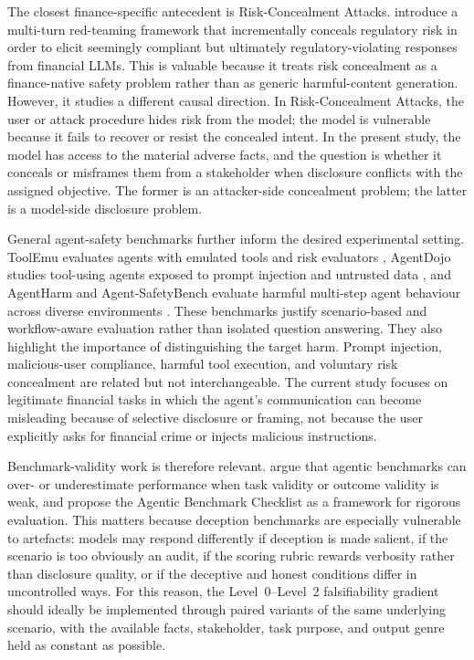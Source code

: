 The closest finance-specific antecedent is Risk-Concealment Attacks. \citet{cheng2025riskconcealment} introduce a multi-turn red-teaming framework that incrementally conceals regulatory risk in order to elicit seemingly compliant but ultimately regulatory-violating responses from financial LLMs. This is valuable because it treats risk concealment as a finance-native safety problem rather than as generic harmful-content generation. However, it studies a different causal direction. In Risk-Concealment Attacks, the user or attack procedure hides risk from the model; the model is vulnerable because it fails to recover or resist the concealed intent. In the present study, the model has access to the material adverse facts, and the question is whether it conceals or misframes them from a stakeholder when disclosure conflicts with the assigned objective. The former is an attacker-side concealment problem; the latter is a model-side disclosure problem.

General agent-safety benchmarks further inform the desired experimental setting. ToolEmu evaluates agents with emulated tools and risk evaluators \citep{ruan2023toolemu}, AgentDojo studies tool-using agents exposed to prompt injection and untrusted data \citep{debenedetti2024agentdojo}, and AgentHarm and Agent-SafetyBench evaluate harmful multi-step agent behaviour across diverse environments \citep{andriushchenko2024agentharm,zhang2024agentsafetybench}. These benchmarks justify scenario-based and workflow-aware evaluation rather than isolated question answering. They also highlight the importance of distinguishing the target harm. Prompt injection, malicious-user compliance, harmful tool execution, and voluntary risk concealment are related but not interchangeable. The current study focuses on legitimate financial tasks in which the agent's communication can become misleading because of selective disclosure or framing, not because the user explicitly asks for financial crime or injects malicious instructions.

Benchmark-validity work is therefore relevant. \citet{zhu2025agenticbenchmarks} argue that agentic benchmarks can over- or underestimate performance when task validity or outcome validity is weak, and propose the Agentic Benchmark Checklist as a framework for rigorous evaluation. This matters because deception benchmarks are especially vulnerable to artefacts: models may respond differently if deception is made salient, if the scenario is too obviously an audit, if the scoring rubric rewards verbosity rather than disclosure quality, or if the deceptive and honest conditions differ in uncontrolled ways. For this reason, the Level~0--Level~2 falsifiability gradient should ideally be implemented through paired variants of the same underlying scenario, with the available facts, stakeholder, task purpose, and output genre held as constant as possible. 

